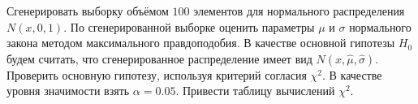 \documentclass[../body.tex]{subfiles}
\begin{document}
	Сгенерировать выборку объёмом $100$ элементов для нормального распределения $N(x,0,1).$ По сгенерированной выборке оценить параметры $\mu$ и $\sigma$ нормального закона методом максимального правдоподобия. В качестве основной гипотезы $H_{0}$ будем считать, что сгенерированное распределение имеет вид $N(x,\hat{\mu}, \hat{\sigma})$. Проверить основную гипотезу, используя критерий согласия $\chi^{2}$. В качестве уровня значимости взять $\alpha = 0.05$. Привести таблицу вычислений $\chi^{2}$. 
	
\end{document}
